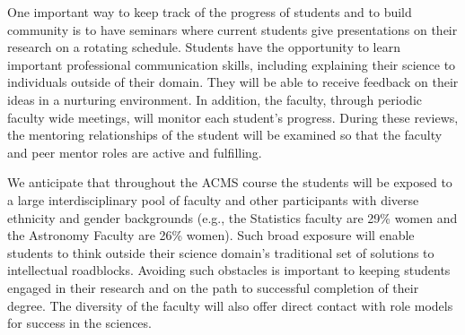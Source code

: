One important way to keep track of the progress of students and to
build community is to have seminars where current students give
presentations on their research on a rotating schedule. Students have
the opportunity to learn important professional communication skills,
including explaining their science to individuals outside of their
domain.  They will be able to receive feedback on their ideas in a
nurturing environment. In addition, the faculty, through periodic
faculty wide meetings, will monitor each student’s progress.  During
these reviews, the mentoring relationships of the student will be
examined so that the faculty and peer mentor roles are active and
fulfilling.

We anticipate that throughout the ACMS course the students will be
exposed to a large interdisciplinary pool of faculty and other participants with
diverse ethnicity and gender backgrounds (e.g., the Statistics faculty
are 29\% women and the Astronomy Faculty are 26\% women).
Such broad exposure will enable students to think outside their
science domain's traditional set of solutions to intellectual
roadblocks.  Avoiding such obstacles is important to keeping students
engaged in their research and on the path to successful completion of
their degree.  The diversity of the faculty will also offer direct
contact with role models for success in the sciences.
